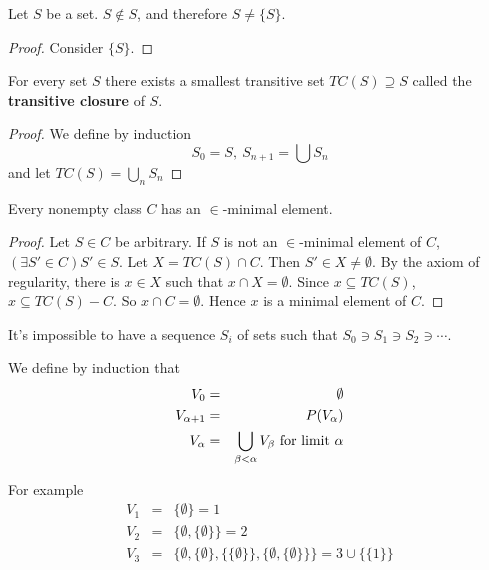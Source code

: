 \documentclass[12pt]{book}
\begin{document}
\begin{lemma}
	Let $S$ be a set. $S\not\in S$, and therefore $S\neq\{S\}$.
\end{lemma}
\begin{proof}
	Consider $\{S\}$.
\end{proof}
	
\begin{lemma}
	For every set $S$ there exists a smallest transitive set $TC(S)\supseteq S$ called the {\bf transitive closure} of $S$.
\end{lemma}
\begin{proof}
	We define by induction 
	\begin{equation}
		S_0=S,\ S_{n+1}=\bigcup S_n
	\end{equation}
	and let $TC(S)=\bigcup_n S_n$
\end{proof}

\begin{lemma}
	Every nonempty class $C$ has an $\in$-minimal element.
\end{lemma}
\begin{proof}
	Let $S\in C$ be arbitrary. If $S$ is not an $\in$-minimal element of $C$, $(\exists S'\in C)S'\in S$. Let $X=TC(S)\cap C$. Then $S'\in X\neq\emptyset$. By the axiom of regularity, there is $x\in X$ such that $x\cap X=\emptyset$. Since $x\subseteq TC(S)$, $x\subseteq TC(S)-C$. So $x\cap C=\emptyset$. Hence $x$ is a minimal element of $C$.
\end{proof}

\begin{corollary}
	It's impossible to have a sequence $S_i$ of sets such that $S_0\ni S_1\ni S_2\ni\cdots$.
\end{corollary}

\begin{definition}
	We define by induction that 
	\begin{eqnarray}
		V_0&=&\emptyset\\
		V_{\alpha+1}&=&P(V_\alpha)\\
		V_\alpha&=&\bigcup_{\beta<\alpha} V_\beta {\rm\ for\ limit\ }\alpha
	\end{eqnarray}
\end{definition}

For example
\begin{eqnarray}
	V_1&=&\{\emptyset\}=1\\
	V_2&=&\{\emptyset,\{\emptyset\}\}=2\\
	V_3&=&\{\emptyset,\{\emptyset\},\{\{\emptyset\}\},\{\emptyset,\{\emptyset\}\}\}=3\cup\{\{1\}\}
\end{eqnarray}
\end{document}
